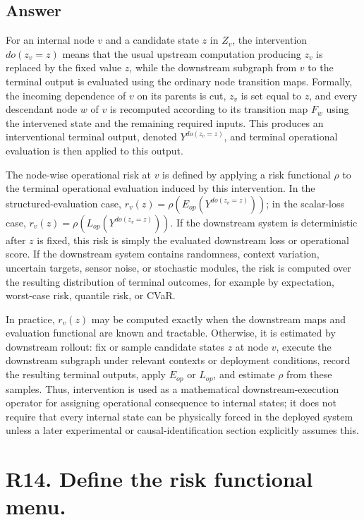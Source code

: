 \documentclass[11pt,a4paper]{article}
\begin{document}
\subsection*{Answer}

For an internal node \(v\) and a candidate state \(z\) in \(Z_v\), the intervention \(do(z_v = z)\) means that the usual upstream computation producing \(z_v\) is replaced by the fixed value \(z\), while the downstream subgraph from \(v\) to the terminal output is evaluated using the ordinary node transition maps. Formally, the incoming dependence of \(v\) on its parents is cut, \(z_v\) is set equal to \(z\), and every descendant node \(w\) of \(v\) is recomputed according to its transition map \(F_w\) using the intervened state and the remaining required inputs. This produces an interventional terminal output, denoted \(Y^{do(z_v=z)}\), and terminal operational evaluation is then applied to this output.

The node-wise operational risk at \(v\) is defined by applying a risk functional \(\rho\) to the terminal operational evaluation induced by this intervention. In the structured-evaluation case, \(r_v(z) = \rho(E_{op}(Y^{do(z_v=z)}))\); in the scalar-loss case, \(r_v(z) = \rho(L_{op}(Y^{do(z_v=z)}))\). If the downstream system is deterministic after \(z\) is fixed, this risk is simply the evaluated downstream loss or operational score. If the downstream system contains randomness, context variation, uncertain targets, sensor noise, or stochastic modules, the risk is computed over the resulting distribution of terminal outcomes, for example by expectation, worst-case risk, quantile risk, or CVaR.

In practice, \(r_v(z)\) may be computed exactly when the downstream maps and evaluation functional are known and tractable. Otherwise, it is estimated by downstream rollout: fix or sample candidate states \(z\) at node \(v\), execute the downstream subgraph under relevant contexts or deployment conditions, record the resulting terminal outputs, apply \(E_{op}\) or \(L_{op}\), and estimate \(\rho\) from these samples. Thus, intervention is used as a mathematical downstream-execution operator for assigning operational consequence to internal states; it does not require that every internal state can be physically forced in the deployed system unless a later experimental or causal-identification section explicitly assumes this.

\section*{R14. Define the risk functional menu.}
\end{document}

